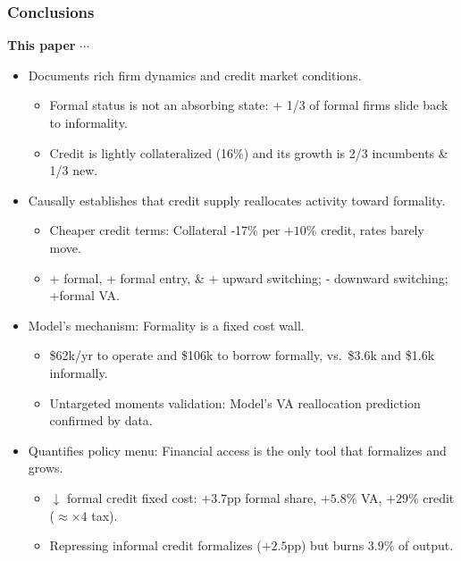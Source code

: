 \documentclass[aspectratio=169]{beamer}
\begin{document}
\begin{frame}
\frametitle{\textbf{Conclusions}} \label{conclusion}

\textbf{This paper} $\cdots$

\vspace{4mm}

\begin{itemize}
    \item Documents rich firm dynamics and credit market conditions.
    \begin{itemize}
        \item Formal status is not an absorbing state: + 1/3 of formal firms slide back to informality.
        \item Credit is lightly collateralized (16\%) and its growth is 2/3 incumbents \& 1/3 new. 
    \end{itemize}
    \vspace{2mm}
    \item Causally establishes that credit supply reallocates activity
    toward formality.
    \begin{itemize}
        \item Cheaper credit terms: Collateral -17\% per $+10\%$ credit, rates barely move.
        \item + formal, + formal entry, \& + upward switching;
        - downward switching; +formal VA.
    \end{itemize}
    \vspace{2mm}
    \item Model's mechanism: Formality is a fixed cost wall.
    \begin{itemize}
        \item \$62k/yr to operate and \$106k to
        borrow formally, vs.\ \$3.6k and \$1.6k informally.
        \item Untargeted moments validation: Model's VA
        reallocation prediction confirmed by data.
    \end{itemize}
    \vspace{2mm}
    \item Quantifies policy menu: Financial access is the only tool that formalizes and grows.
    \begin{itemize}
        \item $\downarrow$ formal credit fixed cost: $+3.7$pp formal share,
        $+5.8\%$ VA, $+29\%$ credit ($\approx \times 4$ tax).
        \item Repressing informal credit formalizes ($+2.5$pp) but burns
        $3.9\%$ of output.
    \end{itemize}
\end{itemize}

\end{frame}
\end{document}

